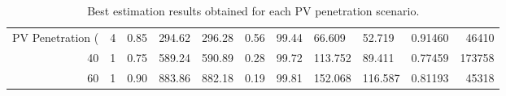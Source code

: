 \begin{table}
\caption{Best estimation results obtained for each PV penetration scenario.}
\label{tab:best_results}
\begin{tabular}{rrllllllllr}
\toprule
PV Penetration (%
\midrule
20 & 4 & 0.85 & 294.62 & 296.28 & 0.56 & 99.44 & 66.609 & 52.719 & 0.91460 & 46410 \\
40 & 1 & 0.75 & 589.24 & 590.89 & 0.28 & 99.72 & 113.752 & 89.411 & 0.77459 & 173758 \\
60 & 1 & 0.90 & 883.86 & 882.18 & 0.19 & 99.81 & 152.068 & 116.587 & 0.81193 & 45318 \\
\bottomrule
\end{tabular}
\end{table}
